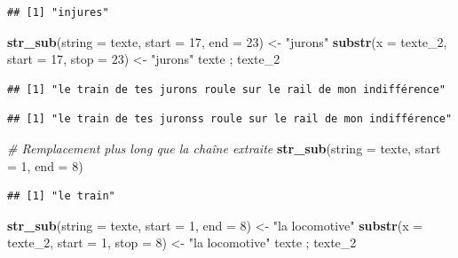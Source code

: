 \documentclass[
  11pt,
]{book}
\newenvironment{Shaded}{\begin{snugshade}}{\end{snugshade}}
\newcommand{\CommentTok}[1]{\textcolor[rgb]{0.56,0.35,0.01}{\textit{#1}}}
\newcommand{\DataTypeTok}[1]{\textcolor[rgb]{0.13,0.29,0.53}{#1}}
\newcommand{\DecValTok}[1]{\textcolor[rgb]{0.00,0.00,0.81}{#1}}
\newcommand{\KeywordTok}[1]{\textcolor[rgb]{0.13,0.29,0.53}{\textbf{#1}}}
\newcommand{\NormalTok}[1]{#1}
\newcommand{\StringTok}[1]{\textcolor[rgb]{0.31,0.60,0.02}{#1}}
\numberwithin{equation}{section}
\numberwithin{countremarque}{section}
\begin{document}
\begin{lstlisting}
## [1] "injures"
\end{lstlisting}

\begin{Shaded}
\begin{Highlighting}[]
\KeywordTok{str\_sub}\NormalTok{(}\DataTypeTok{string =}\NormalTok{ texte, }\DataTypeTok{start =} \DecValTok{17}\NormalTok{, }\DataTypeTok{end =} \DecValTok{23}\NormalTok{) \textless{}{-}}\StringTok{ "jurons"}
\KeywordTok{substr}\NormalTok{(}\DataTypeTok{x =}\NormalTok{ texte\_}\DecValTok{2}\NormalTok{, }\DataTypeTok{start =} \DecValTok{17}\NormalTok{, }\DataTypeTok{stop =} \DecValTok{23}\NormalTok{) \textless{}{-}}\StringTok{ "jurons"}
\NormalTok{texte ; texte\_}\DecValTok{2}
\end{Highlighting}
\end{Shaded}

\begin{lstlisting}
## [1] "le train de tes jurons roule sur le rail de mon indifférence"
\end{lstlisting}

\begin{lstlisting}
## [1] "le train de tes juronss roule sur le rail de mon indifférence"
\end{lstlisting}

\begin{Shaded}
\begin{Highlighting}[]
\CommentTok{\# Remplacement plus long que la chaîne extraite}
\KeywordTok{str\_sub}\NormalTok{(}\DataTypeTok{string =}\NormalTok{ texte, }\DataTypeTok{start =} \DecValTok{1}\NormalTok{, }\DataTypeTok{end =} \DecValTok{8}\NormalTok{)}
\end{Highlighting}
\end{Shaded}

\begin{lstlisting}
## [1] "le train"
\end{lstlisting}

\begin{Shaded}
\begin{Highlighting}[]
\KeywordTok{str\_sub}\NormalTok{(}\DataTypeTok{string =}\NormalTok{ texte, }\DataTypeTok{start =} \DecValTok{1}\NormalTok{, }\DataTypeTok{end =} \DecValTok{8}\NormalTok{) \textless{}{-}}\StringTok{ "la locomotive"}
\KeywordTok{substr}\NormalTok{(}\DataTypeTok{x =}\NormalTok{ texte\_}\DecValTok{2}\NormalTok{, }\DataTypeTok{start =} \DecValTok{1}\NormalTok{, }\DataTypeTok{stop =} \DecValTok{8}\NormalTok{) \textless{}{-}}\StringTok{ "la locomotive"}
\NormalTok{texte ; texte\_}\DecValTok{2}
\end{Highlighting}
\end{Shaded}
\end{document}
